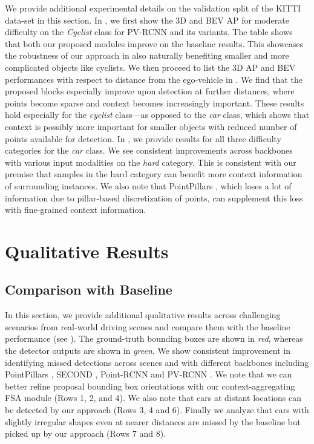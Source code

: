 \documentclass[10pt,twocolumn,letterpaper]{article}
\begin{document}
We provide additional experimental details on the validation split of the KITTI \cite{KITTI} data-set in this section. In , we first show the 3D and BEV AP for moderate difficulty on the \textit{Cyclist} class for PV-RCNN and its variants. The table shows that both our proposed modules improve on the baseline results. This showcases the robustness of our approach in also naturally benefiting smaller and more complicated objects like cyclists. We then proceed to list the 3D AP and BEV performances with respect to distance from the ego-vehicle in . We find that the proposed blocks especially improve upon detection at further distances, where points become sparse and context becomes increasingly important. These results hold especially for the \textit{cyclist} class---as opposed to the \textit{car} class, which shows that context is possibly more important for smaller objects with reduced number of points available for detection. In , we provide results for all three difficulty categories for the \textit{car} class. We see consistent improvements across backbones with various input modalities on the \textit{hard} category. This is consistent with our premise that samples in the hard category can benefit more context information of surrounding instances. We also note that PointPillars \cite{pointpillars}, which loses a lot of information due to pillar-based discretization of points, can supplement this loss with fine-grained context information. \section{Qualitative Results} 
\subsection{Comparison with Baseline}
In this section, we provide additional qualitative results across challenging scenarios from real-world driving scenes and compare them with the baseline performance (see ). The ground-truth bounding boxes are shown in \textit{red}, whereas the detector outputs are shown in \textit{green}. We show consistent improvement in identifying missed detections across scenes and with different backbones including PointPillars \cite{pointpillars}, SECOND \cite{SECOND}, Point-RCNN \cite{PointRCNN} and PV-RCNN \cite{PVRCNN}. We note that we can better refine proposal bounding box orientations with our context-aggregating FSA module (Rows 1, 2, and 4). We also note that cars at distant locations can be detected by our approach (Rows 3, 4 and 6). Finally we analyze that cars with slightly irregular shapes even at nearer distances are missed by the baseline but picked up by our approach (Rows 7 and 8). 
\end{document}

